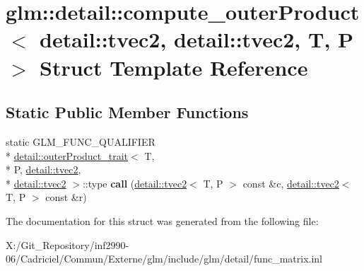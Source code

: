 \hypertarget{structglm_1_1detail_1_1compute__outer_product_3_01detail_1_1tvec2_00_01detail_1_1tvec2_00_01_t_00_01_p_01_4}{\section{glm\-:\-:detail\-:\-:compute\-\_\-outer\-Product$<$ detail\-:\-:tvec2, detail\-:\-:tvec2, T, P $>$ Struct Template Reference}
\label{structglm_1_1detail_1_1compute__outer_product_3_01detail_1_1tvec2_00_01detail_1_1tvec2_00_01_t_00_01_p_01_4}
}
\subsection*{Static Public Member Functions}
\begin{DoxyCompactItemize}
\item 
\hypertarget{structglm_1_1detail_1_1compute__outer_product_3_01detail_1_1tvec2_00_01detail_1_1tvec2_00_01_t_00_01_p_01_4_ae252057faa56756fac328f1d86f0b281}{static G\-L\-M\-\_\-\-F\-U\-N\-C\-\_\-\-Q\-U\-A\-L\-I\-F\-I\-E\-R \\*
\hyperlink{structglm_1_1detail_1_1outer_product__trait}{detail\-::outer\-Product\-\_\-trait}$<$ T, \\*
P, \hyperlink{structglm_1_1detail_1_1tvec2}{detail\-::tvec2}, \\*
\hyperlink{structglm_1_1detail_1_1tvec2}{detail\-::tvec2} $>$\-::type {\bfseries call} (\hyperlink{structglm_1_1detail_1_1tvec2}{detail\-::tvec2}$<$ T, P $>$ const \&c, \hyperlink{structglm_1_1detail_1_1tvec2}{detail\-::tvec2}$<$ T, P $>$ const \&r)}\label{structglm_1_1detail_1_1compute__outer_product_3_01detail_1_1tvec2_00_01detail_1_1tvec2_00_01_t_00_01_p_01_4_ae252057faa56756fac328f1d86f0b281}

\end{DoxyCompactItemize}


The documentation for this struct was generated from the following file\-:\begin{DoxyCompactItemize}
\item 
X\-:/\-Git\-\_\-\-Repository/inf2990-\/06/\-Cadriciel/\-Commun/\-Externe/glm/include/glm/detail/func\-\_\-matrix.\-inl\end{DoxyCompactItemize}
